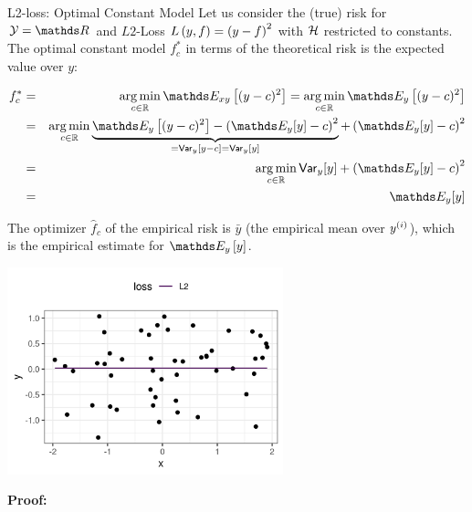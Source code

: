 \documentclass[11pt,compress,t,notes=noshow, xcolor=table]{beamer}
\begin{document}
\begin{vbframe}{L2-loss: Optimal Constant Model}
Let us consider the (true) risk for  $\Yspace = \R$ and $L2$-Loss $L\left(y, f\right) = \left(y-f\right)^2$ with $\mathcal{H}$ restricted to constants. The optimal constant model $f_{c}^{\ast}$ in terms of the theoretical risk is the expected value over $y$: 

\medskip

  \begin{eqnarray*}
    f_{c}^{\ast} &=& \argmin_{c \in \mathbb{R}} \E_{xy} \left[(y-c)^2\right] = \argmin_{c \in \mathbb{R}} \E_{y} \left[(y-c)^2\right] %
    \\
    &=& \argmin_{c \in \mathbb{R}} \underbrace{\E_{y}\left[(y - c)^2\right] - \left(\E_{y}[y] - c\right)^2}_{= \var_{y}[y - c] = \var_{y}[y]} + \left(\E_{y}[y] - c\right)^2 \\
    &=& \argmin_{c \in \mathbb{R}} \var_{y}[y] + \left(\E_{y}[y] - c\right)^2  \\
    &=& \E_{y}[y]
  \end{eqnarray*} 

\framebreak 

The optimizer $\hat{f}_{c}$ of the empirical risk is $\bar y$ (the empirical mean over $y^{(i)}$), which is the empirical estimate for $\E_y \left[y\right]$. 

\begin{center}
\includegraphics[width = 0.6\textwidth ]{figure/L2-loss.png} \\
\end{center}

\framebreak

\textbf{Proof: }

\vspace{0.2cm}


\end{vbframe}
\end{document}
